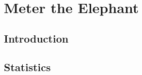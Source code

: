\chapter{Meter the Elephant} \label{chap:me} %

\section {Introduction}
\section {Statistics}
\section {}
